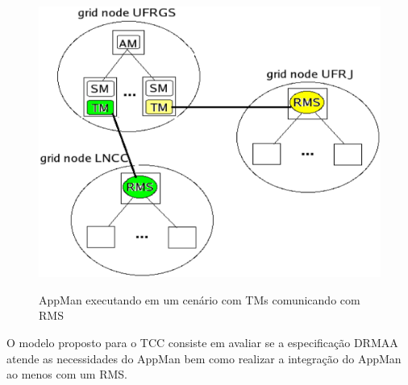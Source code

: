 \begin{figure}[h]
\center
\includegraphics[scale=.2]{img/AppManRMS.eps}
\label{AppManRMS}
\caption{AppMan executando em um cenário com TMs comunicando com RMS}
\end{figure}

O modelo proposto para o TCC consiste em avaliar se a especificação DRMAA atende as necessidades do AppMan bem como realizar a integração do AppMan ao menos com um RMS.
